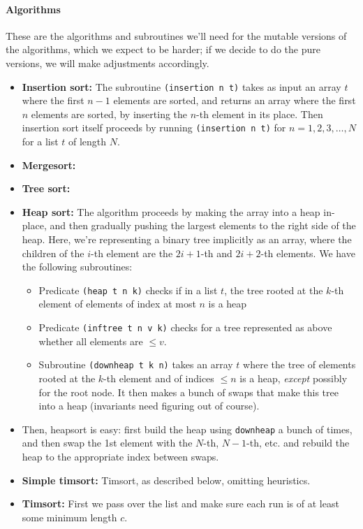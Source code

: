 \documentclass{article}
\begin{document}
\paragraph{Algorithms}
\begin{itemize}
These are the algorithms and subroutines we'll need for the mutable versions of the algorithms, which we expect to be harder; if we decide to do the pure versions, we will make adjustments accordingly.
\begin{itemize}
  \item \textbf{Insertion sort:} The subroutine \verb|(insertion n t)| takes as input an array $t$ where the first $n-1$ elements are sorted, and returns an array where the first $n$ elements are sorted, by inserting the $n$-th element in its place. Then insertion sort itself proceeds by running \verb|(insertion n t)| for $n=1,2,3,\ldots,N$ for a list $t$ of length $N$. 
  \item \textbf{Mergesort:} 
  \item \textbf{Tree sort:}
  \item \textbf{Heap sort:} The algorithm proceeds by making the array into a heap in-place, and then gradually pushing the largest elements to the right side of the heap. Here, we're representing a binary tree implicitly as an array, where the children of the $i$-th element are the $2i+1$-th and $2i+2$-th elements. We have the following subroutines:
  \begin{itemize}
	\item Predicate \verb|(heap t n k)| checks if in a list $t$, the tree rooted at the $k$-th element of elements of index at most $n$ is a heap
	\item Predicate \verb|(inftree t n v k)| checks for a tree represented as above whether all elements are $\leq v$.
	\item Subroutine \verb|(downheap t k n)| takes an array $t$ where the tree of elements rooted at the $k$-th element and of indices $\leq n$ is a heap, \emph{except} possibly for the root node. It then makes a bunch of swaps that make this tree into a heap (invariants need figuring out of course). 
\end{itemize}
	
	\item Then, heapsort is easy: first build the heap using \verb|downheap| a bunch of times, and then swap the 1st element with the $N$-th, $N-1$-th, etc. and rebuild the heap to the appropriate index between swaps.
  \item \textbf{Simple timsort:}
    Timsort, as described below, omitting heuristics.
  \item \textbf{Timsort:}
	  First we pass over the list and make sure each run is of at
    least some minimum length $c$.


\end{itemize}
\end{itemize}
\end{document}
